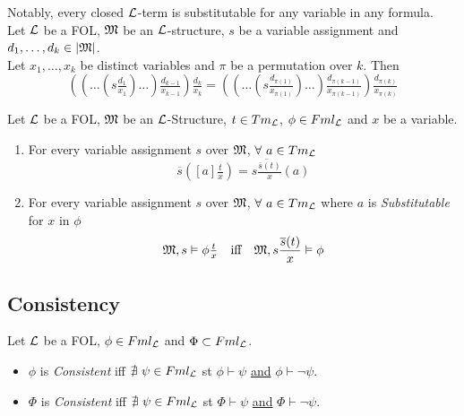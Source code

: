 \documentclass[11pt,a4paper]{article}
\begin{document}


Notably, every closed $\mathcal{L}$-term is substitutable for any variable in any formula.\\

Let $\mathcal{L}$ be a FOL, $\mathfrak{M}$ be an $\mathcal{L}$-structure, $s$ be a variable assignment and $d_1,\dots,d_k\in|\mathfrak{M}|$.\\
Let $x_1,\dots,x_k$ be distinct variables and $\pi$ be a permutation over $k$. Then
$$\left(\left(\dots\left(s\tfrac{d_1}{x_1}\right)\dots\right)\tfrac{d_{k-1}}{x_{k-1}}\right)\tfrac{d_k}{x_k}=\left(\left(\dots\left(s\tfrac{d_{\pi(1)}}{x_{\pi(1)}}\right)\dots\right)\tfrac{d_{\pi(k-1)}}{x_{\pi(k-1)}}\right)\tfrac{d_{\pi(k)}}{x_{\pi(k)}}$$

Let $\mathcal{L}$ be a FOL, $\mathfrak{M}$ be an $\mathcal{L}$-Structure, $t\in Tm_{\mathcal{L}}$, $\phi\in Fml_{\mathcal{L}}$ and $x$ be a variable.\begin{enumerate}
	\item For every variable assignment $s$ over $\mathfrak{M}$, $\forall\ a\in Tm_{\mathcal{L}}$
	$$\overline{s}\left([a]\tfrac{t}x\right)=\overline{s\tfrac{\overline{s}(t)}x}(a)$$
	\item For every variable assignment $s$ over $\mathfrak{M}$, $\forall\ a\in Tm_{\mathcal{L}}$ where $a$ is \textit{Substitutable} for $x$ in $\phi$
	$$\mathfrak{M},s\vDash\phi\tfrac{t}x\quad\text{iff}\quad\mathfrak{M},s\frac{\overline{s}(t)}x\vDash\phi$$
\end{enumerate}



\subsection{Consistency}

Let $\mathcal{L}$ be a FOL, $\phi\in Fml_{\mathcal{L}}$ and $\Phi\subset Fml_{\mathcal{L}}$.
\begin{itemize}
	\item $\phi$ is \textit{Consistent} iff $\nexists\ \psi\in Fml_{\mathcal{L}}$ st $\phi\vdash\psi$ \underline{and} $\phi\vdash\neg\psi$.
	\item $\Phi$ is \textit{Consistent} iff $\nexists\ \psi\in Fml_{\mathcal{L}}$ st $\Phi\vdash\psi$ \underline{and} $\Phi\vdash\neg\psi$.
\end{itemize}
\end{document}
